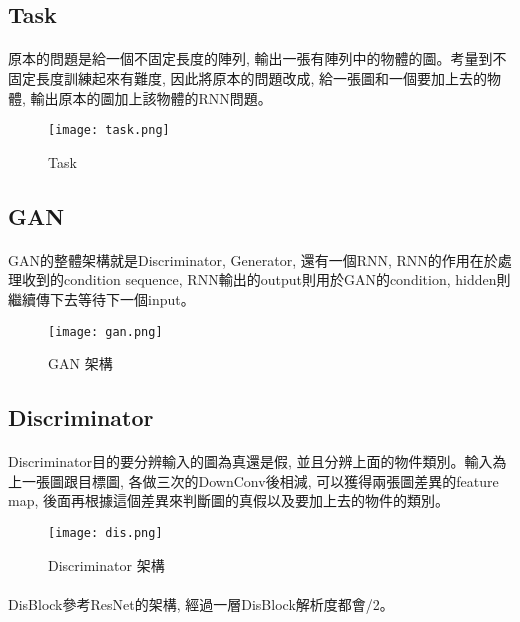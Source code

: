 \subsection{Task}
\paragraph{}
原本的問題是給一個不固定長度的陣列, 輸出一張有陣列中的物體的圖。考量到不固定長度訓練起來有難度, 因此將原本的問題改成, 給一張圖和一個要加上去的物體, 輸出原本的圖加上該物體的RNN問題。
\begin{figure}[!ht]
    \begin{center} 
        \texttt{[image: task.png]}
        \caption{Task}
    \end{center} 
\end{figure}
\subsection{GAN}
\paragraph{}
GAN的整體架構就是Discriminator, Generator, 還有一個RNN, RNN的作用在於處理收到的condition sequence, RNN輸出的output則用於GAN的condition, hidden則繼續傳下去等待下一個input。
\begin{figure}[!ht]
    \begin{center} 
        \texttt{[image: gan.png]}
        \caption{GAN 架構}
    \end{center} 
\end{figure}
\newpage
\subsection{Discriminator}
\paragraph{}
Discriminator目的要分辨輸入的圖為真還是假, 並且分辨上面的物件類別。輸入為上一張圖跟目標圖, 各做三次的DownConv後相減, 可以獲得兩張圖差異的feature map, 後面再根據這個差異來判斷圖的真假以及要加上去的物件的類別。
\begin{figure}[!ht]
    \begin{center} 
        \texttt{[image: dis.png]}
        \caption{Discriminator 架構}
    \end{center} 
\end{figure}
\paragraph{}
DisBlock參考ResNet的架構, 經過一層DisBlock解析度都會/2。
